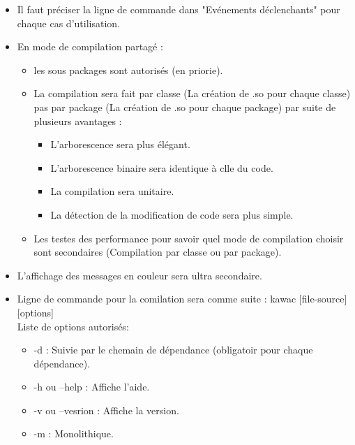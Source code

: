 \documentclass{../../../../../res/rapport}
\begin{document}
\begin{itemize}
            \item Il faut préciser la ligne de commande dans "Evénements déclenchants" pour chaque cas d'utilisation. \\
            \item En mode de compilation partagé : 
                  \begin{itemize}
                      \item les sous packages sont autorisés (en priorie).
                      \item La compilation sera fait par classe (La création de .so pour chaque classe) pas par package (La création de .so pour chaque package) par suite de plusieurs avantages :
                            \begin{itemize}
                                  \item L'arborescence sera plus élégant.
                                  \item L'arborescence binaire sera identique à clle du code.
                                  \item La compilation sera unitaire.
                                  \item La détection de la modification de code sera plus simple.
                            \end{itemize}
                      \item Les testes des performance pour savoir quel mode de compilation choisir sont secondaires (Compilation par classe ou par package). \\
                  \end{itemize}

            \item L'affichage des messages en couleur sera ultra secondaire.\\
            \item Ligne de commande pour la comilation sera comme suite : kawac [file-source][options] \\
                  Liste de options autorisés:
                  \begin{itemize}
                      \item -d : Suivie par le chemain de dépendance (obligatoir pour chaque dépendance). 
                      \item -h ou --help : Affiche l'aide.
                      \item -v ou --vesrion : Affiche la version.
                      \item -m : Monolithique.\\
                  \end{itemize}
            
        \end{itemize}
        
\end{document}
